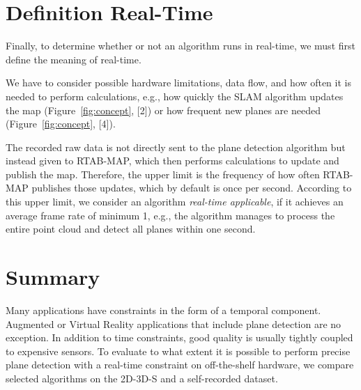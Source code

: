 \documentclass[main.tex]{subfiles}
\begin{document}
\section{Definition Real-Time}\label{sec:realtime}
Finally, to determine whether or not an algorithm runs in real-time, we must first define the meaning of real-time.

We have to consider possible hardware limitations, data flow, and how often it is needed to perform calculations, e.g., how quickly the SLAM algorithm
updates the map (Figure~\ref{fig:concept}, [2]) or how frequent new planes are needed (Figure~\ref{fig:concept}, [4]).

The recorded raw data is not directly sent to the plane detection algorithm but instead given to RTAB-MAP, which then performs
calculations to update and publish the map.
Therefore, the upper limit is the frequency of how often RTAB-MAP publishes those updates, which by default is once per second.
According to this upper limit, we consider an algorithm \textit{real-time applicable}, if it achieves an average frame
rate of minimum 1, e.g., the algorithm manages to process the entire point cloud and detect all planes within one second.


\section{Summary}
Many applications have constraints in the form of a temporal component. Augmented or Virtual Reality applications that include plane detection
are no exception. In addition to time constraints, good quality is usually tightly coupled to expensive sensors.
To evaluate to what extent it is possible to perform precise plane detection with a real-time constraint on off-the-shelf hardware,
we compare selected algorithms on the 2D-3D-S and a self-recorded dataset.
\end{document}
